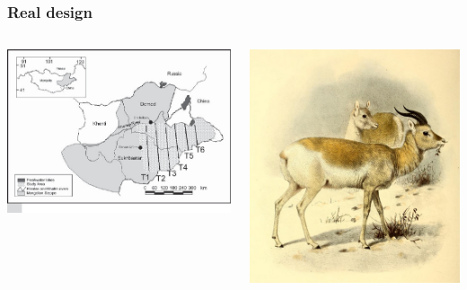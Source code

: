 \documentclass[color=usenames,dvipsnames]{beamer}\usepackage[]{graphicx}\usepackage[]{color}
\begin{document}
\begin{frame}
  \frametitle{Real design}
  \begin{columns}
    \begin{column}{0.6\textwidth}
      \includegraphics[width=\textwidth]{figs/Kirk}
    \end{column}
    \begin{column}{0.4\textwidth}
      \includegraphics[width=\textwidth]{figs/Book_of_antelopes_(1894)_Gazella_gutturosa}
    \end{column}
  \end{columns}
\end{frame}
\end{document}
